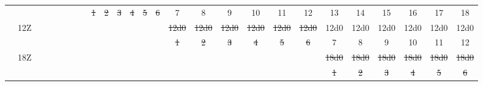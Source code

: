 \begin{sidewaystable}[!htp]
\begin{tabular}{cc|cccccc|cccccc|cccccc|cccccc}
& &     &       &       &       &       &       &   \st{1}   &   \st{2}   &   \st{3}   &   \st{4}   &   \st{5}   &   \st{6}   &   7   &   8   &   9   &   10  &   11  &   12  &   13  &   14  &   15  &   16  &   17  &   18  \\
& 12Z &     &       &       &       &       &       &       &       &       &       &       &       &   \st{12d0}    &   \st{12d0}    &   \st{12d0}    &   \st{12d0}    &   \st{12d0}    &   \st{12d0}    &   12d0    &   12d0    &   12d0    &   12d0    &   12d0    &   12d0    \\
& &     &       &       &       &       &       &       &       &       &       &       &       &   \st{1}   &   \st{2}   &   \st{3}   &   \st{4}   &   \st{5}   &   \st{6}   &   7   &   8   &   9   &   10  &   11  &   12  \\
& 18Z &    &       &       &       &       &       &       &       &       &       &       &       &       &       &       &       &       &       &   \st{18d0}    &   \st{18d0}    &   \st{18d0}    &   \st{18d0}    &   \st{18d0}    &   \st{18d0}    \\
& &     &       &       &       &       &       &       &       &       &       &       &       &       &       &       &       &       &       &   \st{1}   &   \st{2}  &   \st{3}   &   \st{4}   &   \st{5}   &   \st{6}   \\
\bottomrule
\end{tabular}
\end{sidewaystable}

